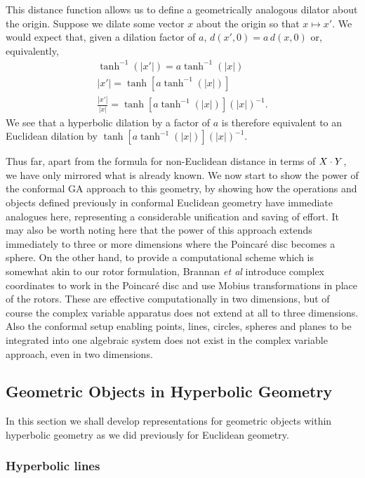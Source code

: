 This distance function allows us to define a geometrically analogous
dilator about the origin. Suppose we dilate some vector $x$ about the
origin so that $x \mapsto x'$. We would expect that, given a dilation
factor of $a$, $d(x',0) = a\,d(x,0)$ or, equivalently,
\begin{eqnarray*}
\tanh^{-1}(|x'|) = a \tanh^{-1}(|x|) \\
|x'| = \tanh[ a \tanh^{-1}(|x|) ] \\
\frac{|x'|}{|x|} = {\tanh[ a \tanh^{-1}(|x|) ]}({|x|})^{-1}.
\end{eqnarray*}
We see that a hyperbolic dilation by a factor of $a$ is therefore
equivalent to an Euclidean dilation by ${\tanh[ a \tanh^{-1}(|x|) ]}({|x|})^{-1}$.

Thus far, apart from the formula for non-Euclidean
distance in terms of $X \cdot Y$, we have only mirrored
what is already known. We now start to show the power of
the conformal GA approach to this geometry, by showing
how the operations and objects defined previously in
conformal Euclidean geometry have immediate analogues
here, representing a considerable unification and saving
of effort. It may also be worth noting here that the
power of this approach extends immediately to three or more
dimensions where the Poincar\'e
disc becomes a sphere. On the other hand, to provide a
computational scheme which is somewhat akin to our rotor
formulation, Brannan \emph{et al} \cite{brannan} introduce complex coordinates
to work in the Poincar\'e disc and use Mobius
transformations in place of the rotors. These are
effective computationally in two dimensions, but of course the
complex variable apparatus does not extend at all to three dimensions.
Also the
conformal setup enabling points, lines, circles, spheres
and planes to be integrated into one algebraic system
does not exist in the complex variable approach, even in
two dimensions.

\subsection{Geometric Objects in Hyperbolic Geometry}

In this section we shall develop representations for geometric objects
within hyperbolic geometry as we did previously for Euclidean geometry.

\subsubsection{Hyperbolic lines}

